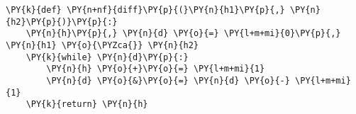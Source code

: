 \begin{Verbatim}[commandchars=\\\{\}]
\PY{k}{def} \PY{n+nf}{diff}\PY{p}{(}\PY{n}{h1}\PY{p}{,} \PY{n}{h2}\PY{p}{)}\PY{p}{:}
    \PY{n}{h}\PY{p}{,} \PY{n}{d} \PY{o}{=} \PY{l+m+mi}{0}\PY{p}{,} \PY{n}{h1} \PY{o}{\PYZca{}} \PY{n}{h2}
    \PY{k}{while} \PY{n}{d}\PY{p}{:}
        \PY{n}{h} \PY{o}{+}\PY{o}{=} \PY{l+m+mi}{1}
        \PY{n}{d} \PY{o}{&}\PY{o}{=} \PY{n}{d} \PY{o}{-} \PY{l+m+mi}{1}
    \PY{k}{return} \PY{n}{h}
\end{Verbatim}
